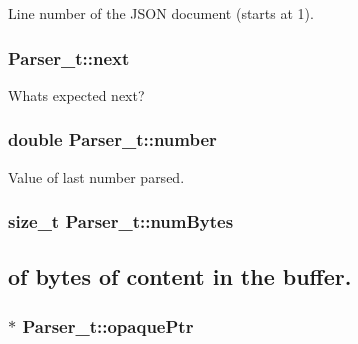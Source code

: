Line number of the J\+S\+ON document (starts at 1). 

\subsubsection[{\texorpdfstring{next}{next}}]{ Parser\+\_\+t\+::next}\hypertarget{struct_parser__t_ae1beff2033c683c5abf1d0ca04dc4d23}{}\label{struct_parser__t_ae1beff2033c683c5abf1d0ca04dc4d23}


What\textquotesingle{}s expected next? 

\subsubsection[{\texorpdfstring{number}{number}}]{\setlength{\rightskip}{0pt plus 5cm}double Parser\+\_\+t\+::number}\hypertarget{struct_parser__t_a8eb65c92082a7c895fe5519419eb293a}{}\label{struct_parser__t_a8eb65c92082a7c895fe5519419eb293a}


Value of last number parsed. 

\subsubsection[{\texorpdfstring{num\+Bytes}{numBytes}}]{\setlength{\rightskip}{0pt plus 5cm}size\+\_\+t Parser\+\_\+t\+::num\+Bytes}\hypertarget{struct_parser__t_af94a3db94dcfdd852d1ad59230e06a15}{}\label{struct_parser__t_af94a3db94dcfdd852d1ad59230e06a15}


\subsection*{of bytes of content in the buffer.}

\subsubsection[{\texorpdfstring{opaque\+Ptr}{opaquePtr}}]{$\ast$ Parser\+\_\+t\+::opaque\+Ptr}\hypertarget{struct_parser__t_a7195b02bd0ace601d6e3efd202039506}{}\label{struct_parser__t_a7195b02bd0ace601d6e3efd202039506}


